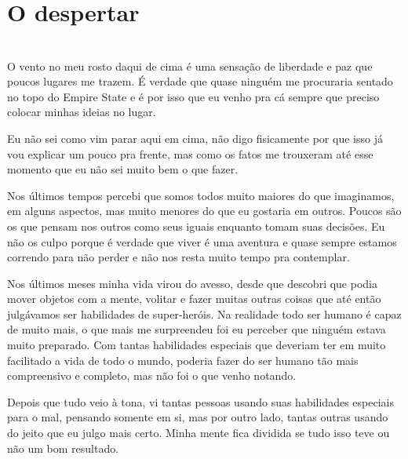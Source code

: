 

\ifdefined\useChapters
\chapter{O despertar}
\else
\chapter{}
\fi




O vento no meu rosto daqui de cima é uma sensação de liberdade e paz que poucos lugares me trazem. É verdade que quase ninguém me procuraria sentado no topo do Empire State e é por isso que eu venho pra cá sempre que preciso colocar minhas ideias no lugar.

Eu não sei como vim parar aqui em cima, não digo fisicamente por que isso já vou explicar um pouco pra frente, mas como os fatos me trouxeram até esse momento que eu não sei muito bem o que fazer.

Nos últimos tempos percebi que somos todos muito maiores do que imaginamos, em alguns aspectos, mas muito menores do que eu gostaria em outros. Poucos são os que pensam nos outros como seus iguais enquanto tomam suas decisões. Eu não os culpo porque é verdade que viver é uma aventura e quase sempre estamos correndo para não perder e não nos resta muito tempo pra contemplar.

Nos últimos meses minha vida virou do avesso, desde que descobri que podia mover objetos com a mente, volitar e fazer muitas outras coisas que até então julgávamos ser habilidades de super-heróis. Na realidade todo ser humano é capaz de muito mais, o que mais me surpreendeu foi eu perceber que ninguém estava muito preparado. Com tantas habilidades especiais que deveriam ter em muito facilitado a vida de todo o mundo, poderia fazer do ser humano tão mais compreensivo e completo, mas não foi o que venho notando.

Depois que tudo veio à tona, vi tantas pessoas usando suas habilidades especiais para o mal, pensando somente em si, mas por outro lado, tantas outras usando do jeito que eu julgo mais certo. Minha mente fica dividida se tudo isso teve ou não um bom resultado.

